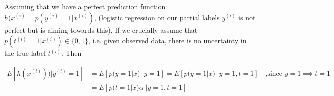 

\begin{answer}
Assuming that we have a perfect prediction function $h(x^{(i)} = p(y^{(i)} = 1 | x^{(i)})$, (logistic regression on our partial labels $y^{(i)}$ is not perfect but is aiming towards this), If we crucially assume that $p(t^{(i)}=1 | x^{(i)}) \in \{0,1\}$, i.e. given observed data, there is no uncertainty in the true label $t^{(i)}$. Then

\begin{align*}
E[h(x^{(i)})) | y^{(i)} = 1]
	&= E[ p(y=1 | x) \;| y=1] = E[ p(y=1 | x) \;| y=1, t=1] \quad \text{,since $y=1 \implies t=1$}\\	
	&= E[ p(t=1 | x) \alpha \;| y=1, t=1] 
\end{align*}
\end{answer}
